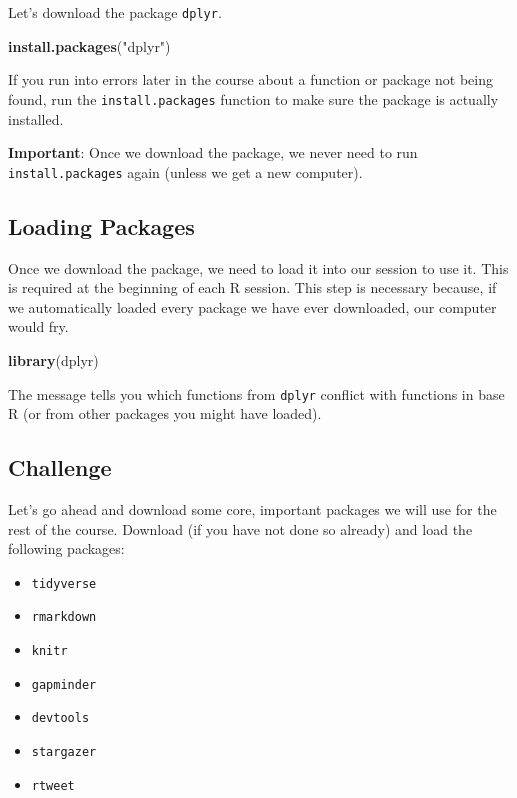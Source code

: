 \documentclass[
]{book}
\newenvironment{Shaded}{\begin{snugshade}}{\end{snugshade}}
\newcommand{\KeywordTok}[1]{\textcolor[rgb]{0.13,0.29,0.53}{\textbf{#1}}}
\newcommand{\NormalTok}[1]{#1}
\newcommand{\StringTok}[1]{\textcolor[rgb]{0.31,0.60,0.02}{#1}}
\providecommand{\tightlist}{%
  \setlength{\itemsep}{0pt}\setlength{\parskip}{0pt}}
\begin{document}
Let's download the package \texttt{dplyr}.

\begin{Shaded}
\begin{Highlighting}[]
\KeywordTok{install.packages}\NormalTok{(}\StringTok{"dplyr"}\NormalTok{)}
\end{Highlighting}
\end{Shaded}

If you run into errors later in the course about a function or package not being found, run the \texttt{install.packages} function to make sure the package is actually installed.

\textbf{Important}: Once we download the package, we never need to run \texttt{install.packages} again (unless we get a new computer).

\hypertarget{loading-packages}{%
\subsection{Loading Packages}\label{loading-packages}}

Once we download the package, we need to load it into our session to use it. This is required at the beginning of each R session. This step is necessary because, if we automatically loaded every package we have ever downloaded, our computer would fry.

\begin{Shaded}
\begin{Highlighting}[]
\KeywordTok{library}\NormalTok{(dplyr)}
\end{Highlighting}
\end{Shaded}

The message tells you which functions from \texttt{dplyr} conflict with functions in base R (or from other packages you might have loaded).

\hypertarget{challenge}{%
\subsection{Challenge}\label{challenge}}

Let's go ahead and download some core, important packages we will use for the rest of the course. Download (if you have not done so already) and load the following packages:

\begin{itemize}
\tightlist
\item
  \texttt{tidyverse}
\item
  \texttt{rmarkdown}
\item
  \texttt{knitr}
\item
  \texttt{gapminder}
\item
  \texttt{devtools}
\item
  \texttt{stargazer}
\item
  \texttt{rtweet}
\end{itemize}
\end{document}
